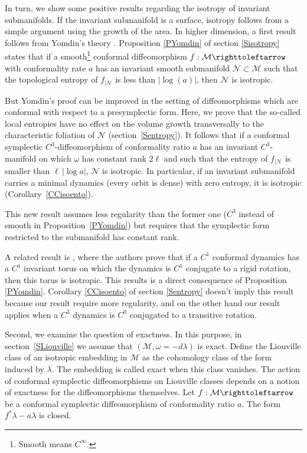 \documentclass[10pt]{amsart}
\theoremstyle{definition}
\def\cM{{\mathcal M}}
\def\cN{{\mathcal N}}
\begin{document}
In turn, we show some positive results regarding the isotropy of invariant submanifolds. If the invariant submanifold is a surface, isotropy follows from a simple argument using the growth of the area. In higher dimension, a first result follows from Yomdin's theory \cite{Yom1987, Gromov1987}. Proposition \ref{PYomdin} of section \ref{Sisotropy} states that if a smooth\footnote{Smooth means $C^\infty$.} conformal diffeomorphism $f: \cM \righttoleftarrow$ with conformality rate $a$ has an invariant smooth submanifold $\cN \subset \cM$ such that the topological entropy of $f_{|\cN}$ is less than $|\log(a)|$, then $\cN$ is isotropic.

But Yomdin's proof can be improved in the setting of diffeomorphisms which are conformal with respect to a presymplectic form. Here, we prove that the so-called local entropies have no effect on the volume growth transversally to the characteristic foliation of $\cN$ (section~\ref{Sentropy}). It follows that if a conformal symplectic $C^3$-diffeomorphism
of conformality ratio $a$ has an invariant $C^3$-manifold on which $\omega$ has constant rank $2\ell$ and such that the entropy of $f_{|\cN}$ is smaller than $\ell\, |\log a|$, $\cN$ is isotropic. In particular, if an invariant submanifold carries a minimal dynamics (every orbit is dense) with zero entropy, it is isotropic (Corollary~\ref{CCisoento}).

This new result assumes less regularity than the former one ($C^3$ instead of smooth in Proposition~\ref{PYomdin}) but requires that the symplectic form restricted to the submanifold has constant rank.

A related result is \cite[2.2.1]{CaCeLlA2013}, where the authors prove that if a $C^1$ conformal dynamics has a $C^1$ invariant torus on which the dynamics is $C^1$ conjugate to a rigid rotation, then this torus is isotropic. This results is a direct consequence of Proposition \ref{PYomdin}. Corollary \ref{CCisoento} of section \ref{Sentropy} doesn't imply this result because our result require more regularity, and on the other hand our result applies when a $C^3$ dynamics is $C^0$ conjugated to a transitive rotation.

Second, we examine the question of exactness. In this purpose, in section~\ref{SLiouville} we assume that $(\cM, \omega=-d\lambda)$ is exact. Define the Liouville class of an isotropic embedding in $\cM$ as the cohomology class of the form induced by $\lambda$. The embedding is called \hbox{exact} when this class vanishes.
The action of conformal symplectic diffeomorphisms on \hbox{Liouville} classes depends on a notion of exactness for the diffeomorphisms themselves. Let $f: \cM \righttoleftarrow$ be a conformal symplectic diffeomorphism of conformality ratio $a$. The form $f^*\lambda-a\lambda$ is closed.
\end{document}
